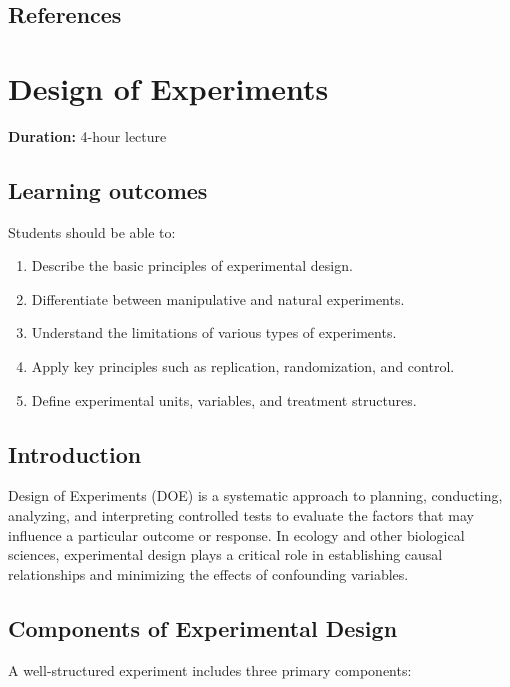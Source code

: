 \documentclass[
]{book}
\providecommand{\tightlist}{%
  \setlength{\itemsep}{0pt}\setlength{\parskip}{0pt}}
\begin{document}
\section{References}\label{references-4}

\chapter{Design of Experiments}\label{design-of-experiments}

\textbf{Duration:} 4-hour lecture

\section{Learning outcomes}\label{learning-outcomes-5}

Students should be able to:

\begin{enumerate}
\def\labelenumi{\arabic{enumi}.}
\tightlist
\item
  Describe the basic principles of experimental design.
\item
  Differentiate between manipulative and natural experiments.
\item
  Understand the limitations of various types of experiments.
\item
  Apply key principles such as replication, randomization, and control.
\item
  Define experimental units, variables, and treatment structures.
\end{enumerate}

\section{Introduction}\label{introduction-5}

Design of Experiments (DOE) is a systematic approach to planning, conducting, analyzing, and interpreting controlled tests to evaluate the factors that may influence a particular outcome or response. In ecology and other biological sciences, experimental design plays a critical role in establishing causal relationships and minimizing the effects of confounding variables.

\section{Components of Experimental Design}\label{components-of-experimental-design}

A well-structured experiment includes three primary components:
\end{document}
